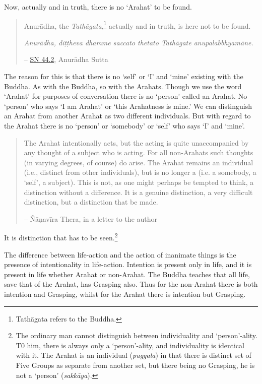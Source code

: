 Now, actually and in truth, there is no `Arahat' to be found.

\begin{quote}
Anurādha, the \emph{Tathāgata},\footnote{Tathāgata refers to the Buddha.} actually and in truth, is here not to be found.

\emph{Anurādha, diṭṭheva dhamme saccato thetato Tathāgate anupalabbhyamāne.}

 -- \href{https://suttacentral.net/sn44.2/en/sujato}{SN 44.2}, Anurādha Sutta
\end{quote}

The reason for this is that there is no `self' or `I' and `mine' existing with the Buddha. As with the Buddha, so with the Arahats. Though we use the word `Arahat' for purposes of conversation there is no `person' called an Arahat. No `person' who says `I am Arahat' or `this Arahatness is mine.' We can distinguish an Arahat from another Arahat as two different individuals. But with regard to the Arahat there is no `person' or `somebody' or `self' who says `I' and `mine'.

\begin{quote}
The Arahat intentionally acts, but the acting is quite unaccompanied by any thought of a subject who is acting. For all non-Arahats such thoughts (in varying degrees, of course) do arise. The Arahat remains an individual (i.e., distinct from other individuals), but is no longer a  (i.e. a somebody, a `self', a subject). This is not, as one might perhaps be tempted to think, a distinction without a difference. It is a genuine distinction, a very difficult distinction, but a distinction that  be made.

 -- Ñāṇavīra Thera, in a letter to the author
\end{quote}

It is  distinction that has to be seen.\footnote{The ordinary man cannot distinguish between individuality and `person'-ality. T0 him, there is always only a `person'-ality, and individuality is identical with it. The Arahat is an individual (\emph{puggala}) in that there is distinct set of Five Groups as separate from another set, but there being no Grasping, he is not a `person' (\emph{sakkāya}).}

The difference between life-action and the action of inanimate things is the presence of intentionality in life-action. Intention is present only in life, and it is present in  life whether Arahat or non-Arahat. The Buddha teaches that all life, save that of the Arahat, has Grasping also. Thus for the non-Arahat there is both intention and Grasping, whilst for the Arahat there is intention but  Grasping.

